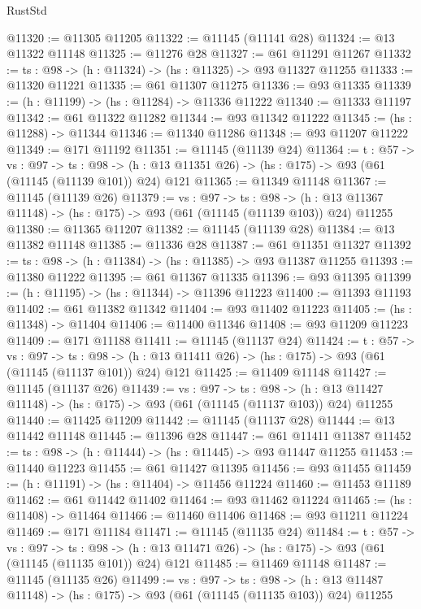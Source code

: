 \begin{lexlean}{RustStd}
\begin{coremodule}
@11320 := @11305 @11205
@11322 := @11145 (@11141 @28)
@11324 := @13 @11322 @11148
@11325 := @11276 @28
@11327 := @61 @11291 @11267
@11332 := {ts : @98} -> (h : @11324) -> (hs : @11325) -> @93 @11327 @11255
@11333 := @11320 @11221
@11335 := @61 @11307 @11275
@11336 := @93 @11335
@11339 := (h : @11199) -> (hs : @11284) -> @11336 @11222
@11340 := @11333 @11197
@11342 := @61 @11322 @11282
@11344 := @93 @11342 @11222
@11345 := (hs : @11288) -> @11344
@11346 := @11340 @11286
@11348 := @93 @11207 @11222
@11349 := @171 @11192
@11351 := @11145 (@11139 @24)
@11364 := {t : @57} ->
  {vs : @97} ->
  {ts : @98} -> (h : @13 @11351 @26) -> (hs : @175) -> @93 (@61 (@11145 (@11139 @101)) @24) @121
@11365 := @11349 @11148
@11367 := @11145 (@11139 @26)
@11379 := {vs : @97} ->
  {ts : @98} ->
  (h : @13 @11367 @11148) -> (hs : @175) -> @93 (@61 (@11145 (@11139 @103)) @24) @11255
@11380 := @11365 @11207
@11382 := @11145 (@11139 @28)
@11384 := @13 @11382 @11148
@11385 := @11336 @28
@11387 := @61 @11351 @11327
@11392 := {ts : @98} -> (h : @11384) -> (hs : @11385) -> @93 @11387 @11255
@11393 := @11380 @11222
@11395 := @61 @11367 @11335
@11396 := @93 @11395
@11399 := (h : @11195) -> (hs : @11344) -> @11396 @11223
@11400 := @11393 @11193
@11402 := @61 @11382 @11342
@11404 := @93 @11402 @11223
@11405 := (hs : @11348) -> @11404
@11406 := @11400 @11346
@11408 := @93 @11209 @11223
@11409 := @171 @11188
@11411 := @11145 (@11137 @24)
@11424 := {t : @57} ->
  {vs : @97} ->
  {ts : @98} -> (h : @13 @11411 @26) -> (hs : @175) -> @93 (@61 (@11145 (@11137 @101)) @24) @121
@11425 := @11409 @11148
@11427 := @11145 (@11137 @26)
@11439 := {vs : @97} ->
  {ts : @98} ->
  (h : @13 @11427 @11148) -> (hs : @175) -> @93 (@61 (@11145 (@11137 @103)) @24) @11255
@11440 := @11425 @11209
@11442 := @11145 (@11137 @28)
@11444 := @13 @11442 @11148
@11445 := @11396 @28
@11447 := @61 @11411 @11387
@11452 := {ts : @98} -> (h : @11444) -> (hs : @11445) -> @93 @11447 @11255
@11453 := @11440 @11223
@11455 := @61 @11427 @11395
@11456 := @93 @11455
@11459 := (h : @11191) -> (hs : @11404) -> @11456 @11224
@11460 := @11453 @11189
@11462 := @61 @11442 @11402
@11464 := @93 @11462 @11224
@11465 := (hs : @11408) -> @11464
@11466 := @11460 @11406
@11468 := @93 @11211 @11224
@11469 := @171 @11184
@11471 := @11145 (@11135 @24)
@11484 := {t : @57} ->
  {vs : @97} ->
  {ts : @98} -> (h : @13 @11471 @26) -> (hs : @175) -> @93 (@61 (@11145 (@11135 @101)) @24) @121
@11485 := @11469 @11148
@11487 := @11145 (@11135 @26)
@11499 := {vs : @97} ->
  {ts : @98} ->
  (h : @13 @11487 @11148) -> (hs : @175) -> @93 (@61 (@11145 (@11135 @103)) @24) @11255

\end{coremodule}
\end{lexlean}
